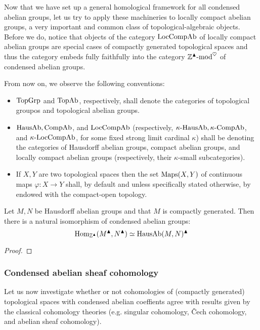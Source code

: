             Now that we have set up a general homological framework for all condensed abelian groups, let us try to apply these machineries to locally compact abelian groups, a very important and common class of topological-algebraic objects. Before we do, notice that objects of the category $\mathrm{Loc}\mathrm{Comp}\mathrm{Ab}$ of locally compact abelian groups are special cases of compactly generated topological spaces and thus the category embeds fully faithfully into the category $\mathbb{Z}^{\blacktriangle}\text{-}\mathrm{mod}^{\heartsuit}$ of condensed abelian groups. 
            \begin{convention}
                From now on, we observe the following conventions:
                    \begin{itemize}
                        \item $\mathrm{Top}\mathrm{Grp}$ and $\mathrm{Top}\mathrm{Ab}$, respectively, shall denote the categories of topological groupos and topological abelian groups.
                        \item $\mathrm{Haus}\mathrm{Ab}, \mathrm{Comp}\mathrm{Ab}$, and $\mathrm{Loc}\mathrm{Comp}\mathrm{Ab}$ (respectively, $\kappa\text{-}\mathrm{Haus}\mathrm{Ab}, \kappa\text{-}\mathrm{Comp}\mathrm{Ab}$, and $\kappa\text{-}\mathrm{Loc}\mathrm{Comp}\mathrm{Ab}$, for some fixed strong limit cardinal $\kappa$) shall be denoting the categories of Hausdorff abelian groups, compact abelian groups, and locally compact abelian groups (respectively, their $\kappa$-small subcategories). 
                        \item If $X, Y$ are two topological spaces then the set $\mathrm{Maps}(X, Y)$ of continuous maps $\varphi: X \to Y$ shall, by default and unless specifically stated otherwise, by endowed with the compact-open topology. 
                    \end{itemize}
            \end{convention}
            \begin{lemma} \label{lemma: condensing_hom_sets_between_hausdorff_abelian_groups}
                Let $M, N$ be Hausdorff abelian groups and that $M$ is compactly generated. Then there is a natural isomorphism of condensed abelian groups:
                    $$\mathrm{Hom}_{\mathbb{Z}^{\blacktriangle}}(M^{\blacktriangle}, N^{\blacktriangle}) \simeq \mathrm{Haus}\mathrm{Ab}(M, N)^{\blacktriangle}$$
            \end{lemma}
                \begin{proof}
                    
                \end{proof}
                
        \subsubsection{Condensed abelian sheaf cohomology}
            Let us now investigate whether or not cohomologies of (compactly generated) topological spaces with condensed abelian coeffients agree with results given by the classical cohomology theories (e.g. singular cohomology, \v{C}ech cohomology, and abelian sheaf cohomology).
        
